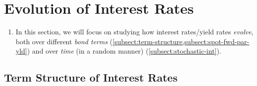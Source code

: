 \section{Evolution of Interest Rates}
\label{sect:int-evol}
\begin{enumerate}
\item In this section, we will focus on studying how interest rates/yield rates
\emph{evolve}, both over different \emph{bond terms}
(\cref{subsect:term-structure,subsect:spot-fwd-par-yld}) and over \emph{time}
(in a random manner) (\cref{subsect:stochastic-int}).
\end{enumerate}

\subsection{Term Structure of Interest Rates}
\label{subsect:term-structure}
